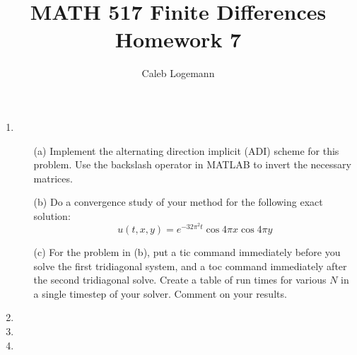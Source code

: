 \documentclass[11pt, oneside, titlepage]{article}
\title{MATH 517 Finite Differences Homework 7}
\author{Caleb Logemann}
\begin{document}
\maketitle

%
\begin{enumerate}
    \item %
        \begin{enumerate}
            \item[(a)]
                Implement the alternating direction implicit (ADI) scheme for
                this problem.
                Use the backslash operator in MATLAB to invert the necessary
                matrices.

            \item[(b)]
                Do a convergence study of your method for the following exact
                solution:
                \[
                    u(t, x, y) = e^{-32 \pi^2 t} \cos{4 \pi x} \cos{4\pi y}
                \]

            \item[(c)]
                For the problem in (b), put a tic command immediately before you
                solve the first tridiagonal system, and a toc command
                immediately after the second tridiagonal solve.
                Create a table of run times for various $N$ in a single timestep 
                of your solver.
                Comment on your results.
        \end{enumerate}

    \item %
    \item %
    \item %
\end{enumerate}
\end{document}
